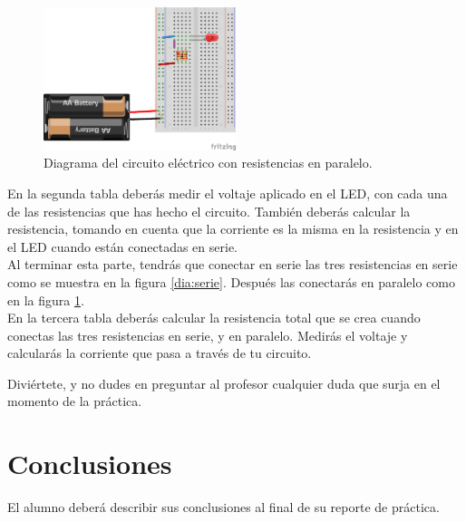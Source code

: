     \begin{figure}[h]
    	\begin{center}
    		\includegraphics[width=0.5\textwidth]{images/LED-bateria-resistencias-paralelo.png}
    		\caption{Diagrama del circuito eléctrico con resistencias en paralelo.}
    		\label{dia:paralelo}
    	\end{center}
    \end{figure}

    En la segunda tabla deberás medir el voltaje aplicado en el LED, con cada una de las resistencias que has hecho el circuito. También deberás calcular la resistencia, tomando en cuenta que la corriente es la misma en la resistencia y en el LED cuando están conectadas en serie. \\

    Al terminar esta parte, tendrás que conectar en serie las tres resistencias en serie como se muestra en la figura \ref{dia:serie}. Después las conectarás en paralelo como en la figura \ref{dia:paralelo}. \\

    En la tercera tabla deberás calcular la resistencia total que se crea cuando conectas las tres resistencias en serie, y en paralelo. Medirás el voltaje y calcularás la corriente que pasa a través de tu circuito.

    Diviértete, y no dudes en preguntar al profesor cualquier duda que surja en el momento de la práctica. \\


\section{Conclusiones}
	El alumno deberá describir sus conclusiones al final de su reporte de práctica.

